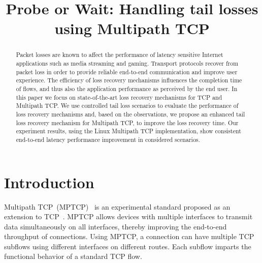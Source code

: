 \documentclass[10pt,conference]{IEEEtran}
\title{Probe or Wait: Handling tail losses using Multipath TCP}
\author{\IEEEauthorblockN{Kiran~Yedugundla, Per~Hurtig, Anna~Brunstrom}
\IEEEauthorblockA{Dept. of Computer Science, Karlstad University, Karlstad, Sweden\\
    \{name.surname\}@kau.se
}}
\begin{document}
\maketitle

\begin{abstract}
Packet losses are known to affect the performance of latency sensitive Internet applications such as media streaming and gaming. 
Transport protocols recover from packet loss in order to provide reliable end-to-end communication and improve user experience. The efficiency of 
loss recovery mechanisms influences the completion time of flows, and thus also the application performance as perceived by the
end user. In this paper we focus on state-of-the-art loss recovery mechanisms for TCP 
and Multipath TCP. We use controlled tail loss scenarios to evaluate the performance of loss recovery mechanisms and, based on the observations, 
we propose an enhanced tail loss recovery mechanism for Multipath TCP, to improve the loss recovery time. Our experiment results, using the Linux 
Multipath TCP implementation, show consistent end-to-end latency performance improvement in considered scenarios. 
\end{abstract}

\section{Introduction}


Multipath TCP~(MPTCP)~\cite{rfc6824} is an experimental standard proposed as an extension to TCP~\cite{rfc793}. MPTCP allows devices with multiple interfaces to 
transmit data simultaneously on all interfaces, thereby improving the end-to-end throughput of connections. Using MPTCP, a connection can have 
multiple TCP subflows using different interfaces on different routes. Each subflow imparts the functional behavior of a standard TCP flow. 
\end{document}
